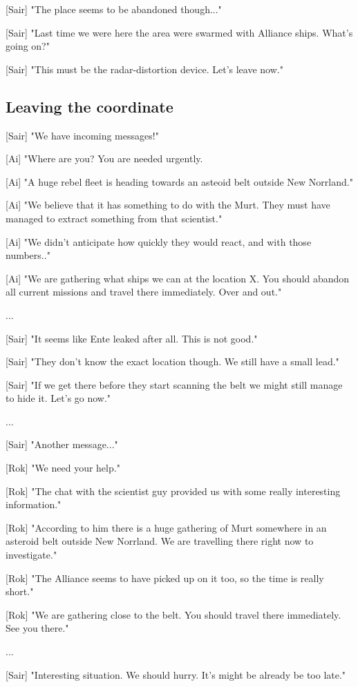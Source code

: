 \documentclass[a4paper,12pt]{article}
\begin{document}
[Sair] "The place seems to be abandoned though..."

[Sair] "Last time we were here the area were swarmed with Alliance ships. What's going on?"

[Sair] "This must be the radar-distortion device. Let's leave now."

\subsection{Leaving the coordinate}

[Sair] "We have incoming messages!"

[Ai] "Where are you? You are needed urgently.

[Ai] "A huge rebel fleet is heading towards an asteoid belt outside New Norrland." 

[Ai] "We believe that it has something to do with the Murt. They must have managed to extract something from that scientist." 

[Ai] "We didn't anticipate how quickly they would react, and with those numbers.." 

[Ai] "We are gathering what ships we can at the location X. You should abandon all current missions and travel there
immediately. Over and out."

...

[Sair] "It seems like Ente leaked after all. This is not good."

[Sair] "They don't know the exact location though. We still have a small lead." 

[Sair] "If we get there before they start scanning the belt we might still manage to hide it. Let's go now."

...

[Sair] "Another message..."

[Rok] "We need your help." 

[Rok] "The chat with the scientist guy provided us with some really interesting information." 

[Rok] "According to him there is a huge gathering of Murt somewhere in an asteroid belt outside New Norrland. We are travelling there right now to investigate."

[Rok] "The Alliance seems to have picked up on it too, so the time is really short." 

[Rok] "We are gathering close to the belt. You should travel there immediately. See you there."

...

[Sair] "Interesting situation. We should hurry. It's might be already be too late."
\end{document}
